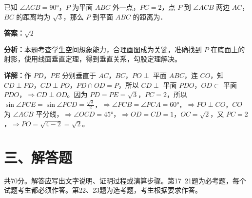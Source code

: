 \begin{question}[points=5]
已知 $\angle ACB = 90°$，$P$ 为平面 $ABC$ 外一点，$PC=2$，点 $P$ 到 $\angle ACB$ 两边 $AC$，$BC$ 的距离均为 $\sqrt{3}$，那么 $P$ 到平面 $ABC$ 的距离为．
\fillin[{$\sqrt{2}$}]
\begin{solution}
\textbf{答案：}$\sqrt{2}$

\textbf{分析：}本题考查学生空间想象能力，合理画图成为关键，准确找到 $P$ 在底面上的射影，使用线面垂直定理，得到垂直关系，勾股定理解决。

\textbf{详解：}作 $PD$，$PE$ 分别垂直于 $AC$，$BC$，$PO \perp$ 平面 $ABC$，连 $CO$，知 $CD \perp PD$，$CD \perp PO$，$PD \cap OD = P$，所以 $CD \perp$ 平面 $PDO$，$OD \subset$ 平面 $PDO$，$\Rightarrow CD \perp OD$。因为 $PD = PE = \sqrt{3}$，$PC=2$，所以 $\sin\angle PCE = \sin\angle PCD = \frac{\sqrt{3}}{2}$，$\Rightarrow \angle PCB = \angle PCA = 60°$，$\Rightarrow PO \perp CO$，$CO$ 为 $\angle ACB$ 平分线，$\Rightarrow \angle OCD = 45°$，$\Rightarrow OD = CD = 1$，$OC = \sqrt{2}$，又 $PC=2$，$\Rightarrow PO = \sqrt{4-2} = \sqrt{2}$。
\end{solution}
\end{question}

\section*{三、解答题}
共70分。解答应写出文字说明、证明过程或演算步骤。第17~21题为必考题，每个试题考生都必须作答。第22、23题为选考题，考生根据要求作答。

